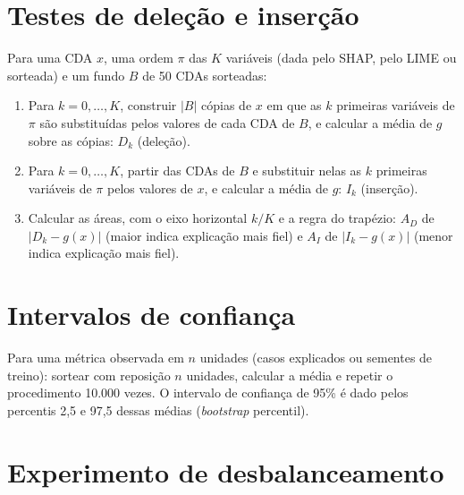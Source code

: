 \begin{apendicesenv}
\section{Testes de deleção e inserção}
\label{ap:alg_delecao}

Para uma CDA $x$, uma ordem $\pi$ das $K$ variáveis (dada pelo SHAP, pelo LIME ou sorteada) e um fundo $B$ de 50 CDAs sorteadas:

\begin{enumerate}
    \item Para $k = 0, \dots, K$, construir $|B|$ cópias de $x$ em que as $k$ primeiras variáveis de $\pi$ são substituídas pelos valores de cada CDA de $B$, e calcular a média de $g$ sobre as cópias: $D_k$ (deleção).
    \item Para $k = 0, \dots, K$, partir das CDAs de $B$ e substituir nelas as $k$ primeiras variáveis de $\pi$ pelos valores de $x$, e calcular a média de $g$: $I_k$ (inserção).
    \item Calcular as áreas, com o eixo horizontal $k/K$ e a regra do trapézio: $A_D$ de $|D_k - g(x)|$ (maior indica explicação mais fiel) e $A_I$ de $|I_k - g(x)|$ (menor indica explicação mais fiel).
\end{enumerate}

\section{Intervalos de confiança}
\label{ap:alg_ic}

Para uma métrica observada em $n$ unidades (casos explicados ou sementes de treino): sortear com reposição $n$ unidades, calcular a média e repetir o procedimento 10.000 vezes. O intervalo de confiança de 95\% é dado pelos percentis 2,5 e 97,5 dessas médias (\textit{bootstrap} percentil).

\section{Experimento de desbalanceamento}
\label{ap:alg_desbalanceamento}


\end{apendicesenv}
